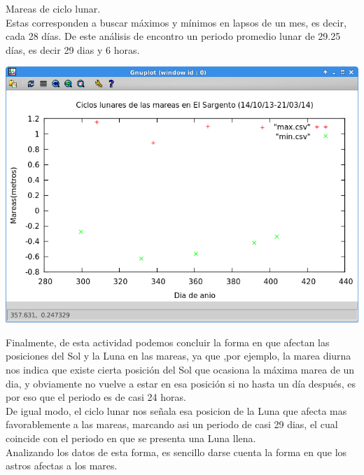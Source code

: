 \documentclass[12pt]{article}
\begin{document}
\begin{large}
Mareas de ciclo lunar.\\
Estas corresponden a buscar máximos y mínimos en lapsos de un mes, es decir, cada 28 días. De este análisis de encontro un periodo promedio lunar de 29.25 días, es decir 29 dias y 6 horas.

\begin{center}
\includegraphics[scale=0.8]{Sin_nombre.png} 
\end{center}

Finalmente, de esta actividad podemos concluir la forma en que afectan las posiciones del Sol y la Luna en las mareas, ya que ,por ejemplo, la marea diurna nos indica que existe cierta posición del Sol que ocasiona la máxima marea de un dia, y obviamente no vuelve a estar en esa posición si no hasta un día después, es por eso que el periodo es de casi 24 horas.\\
De igual modo, el ciclo lunar nos señala esa posicion de la Luna que afecta mas favorablemente a las mareas, marcando asi un periodo de casi 29 dias, el cual coincide con el periodo en que se presenta una Luna llena.\\
Analizando los datos de esta forma, es sencillo darse cuenta la forma en que los astros afectas a los mares.

\end{large}
\end{document}

